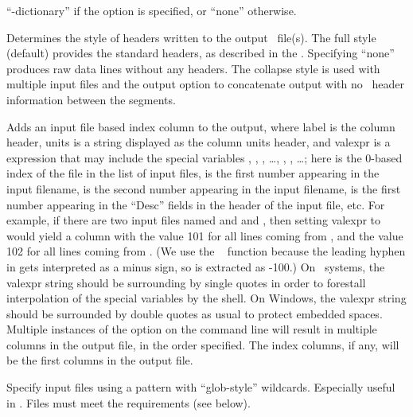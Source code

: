 \begin{description}
  ``-dictionary'' if the  option is specified, or ``none''
  otherwise.
\item[\optkey{-headers \boa full\pipe collapse\pipe none\bca}]
  Determines the style of headers written to the output \ODT\ file(s).
  The full style (default) provides the standard headers, as described
  in the .  Specifying ``none'' produces raw data
  lines without any headers.  The collapse style is used with multiple
  input files and the  output option to concatenate
  output with no \ODT\ header information between the segments.
\item[\optkey{-index label units valexpr}]
  Adds an input file based index column to the output, where label is
  the column header, units is a string displayed as the column units
  header, and valexpr is a \Tcl\  expression that may include
  the special variables , , , \ldots, ,
  , \ldots; here  is the 0-based index of
  the file in the list of input files,  is the first number
  appearing in the input filename,  is the second number
  appearing in the input filename,  is the first number
  appearing in the ``Desc'' fields in the header of the input file,
  etc.  For example, if there are two input files named
   and and , then setting valexpr to
   would yield a column with the value 101 for all lines
  coming from , and the value 102 for all lines coming
  from  .  (We use the \Tcl\  function
   because the leading hyphen in  gets
  interpreted as a minus sign, so  is extracted as -100.)
  On \Unix\ systems, the valexpr string should be surrounding by single
  quotes in order to forestall interpolation of the special variables
  by the shell.  On Windows, the valexpr string should be surrounded
  by double quotes as usual to protect embedded spaces.
  Multiple instances of the  option on the command line
  will result in multiple columns in the output file, in the order
  specified.  The index columns, if any, will be the first columns in
  the output file.
\item[\optkey{-ipat pattern}]
  Specify input files using a pattern with ``glob-style'' wildcards.
  Especially useful in \DOS.  Files must meet the 
  requirements (see below).
\item[\optkey{-normalize \boa 0\pipe 1\bca}]

\end{description}
